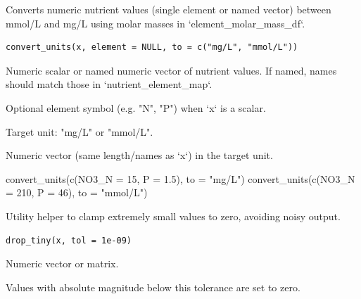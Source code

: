 \documentclass[a4paper]{book}
\begin{document}
%
\begin{Description}
Converts numeric nutrient values (single element or named vector)
between mmol/L and mg/L using molar masses in `element\_molar\_mass\_df`.
\end{Description}
%
\begin{Usage}
\begin{verbatim}
convert_units(x, element = NULL, to = c("mg/L", "mmol/L"))
\end{verbatim}
\end{Usage}
%
\begin{Arguments}
\begin{ldescription}
\item[\code{x}] Numeric scalar or named numeric vector of nutrient values.
If named, names should match those in `nutrient\_element\_map`.

\item[\code{element}] Optional element symbol (e.g. "N", "P") when `x` is a scalar.

\item[\code{to}] Target unit: "mg/L" or "mmol/L".
\end{ldescription}
\end{Arguments}
%
\begin{Value}
Numeric vector (same length/names as `x`) in the target unit.
\end{Value}
%
\begin{Examples}
\begin{ExampleCode}
convert_units(c(NO3_N = 15, P = 1.5), to = "mg/L")
convert_units(c(NO3_N = 210, P = 46), to = "mmol/L")
\end{ExampleCode}
\end{Examples}
%
\begin{Description}
Utility helper to clamp extremely small values to zero, avoiding noisy output.
\end{Description}
%
\begin{Usage}
\begin{verbatim}
drop_tiny(x, tol = 1e-09)
\end{verbatim}
\end{Usage}
%
\begin{Arguments}
\begin{ldescription}
\item[\code{x}] Numeric vector or matrix.

\item[\code{tol}] Values with absolute magnitude below this tolerance are set to zero.
\end{ldescription}
\end{Arguments}
\end{document}

